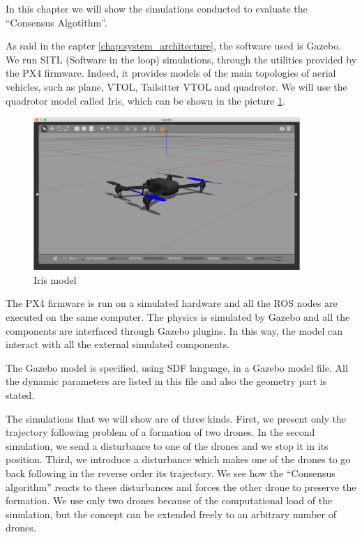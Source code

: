 In this chapter we will show the simulations conducted to evaluate the “Consensus
Algotithm”.

As said in the capter \ref{chap:system_architecture}, the software used is Gazebo.
We run SITL (Software in the loop) simulations, through the utilities provided by
the PX4 firmware. Indeed, it provides models of the main topologies of aerial vehicles,
such as plane, VTOL, Tailsitter VTOL and quadrotor.
We will use the quadrotor model called Iris, which can be shown in the picture \ref{fig:iris_model}.

\begin{figure}[h]
\centering
\includegraphics[width=0.9\textwidth]{chapters/chapter-04/figures/iris_model.png}
\caption{Iris model}
\label{fig:iris_model}
\end{figure}

The PX4 firmware is run on a simulated hardware and all the ROS nodes are executed
on the same computer. The physics is simulated by Gazebo and all the components
are interfaced through Gazebo plugins. In this way, the model can interact with
all the external simulated components.

The Gazebo model is specified, using SDF language, in a Gazebo model file.
All the dynamic parameters are listed in this file and also the geometry part
is stated.

The simulations that we will show are of three kinds. First, we present only
the trajectory following problem of a formation of two drones.
In the second simulation, we send a disturbance to one of the drones and we stop it
in its position. Third, we introduce a disturbance which makes one of the drones to
go back following in the reverse order its trajectory.
We see how the “Consensus algorithm” reacts to these disturbances and forces the other
drone to preserve the formation.
We use only two drones because of the computational load of the simulation, but the
concept can be extended freely to an arbitrary number of drones.

